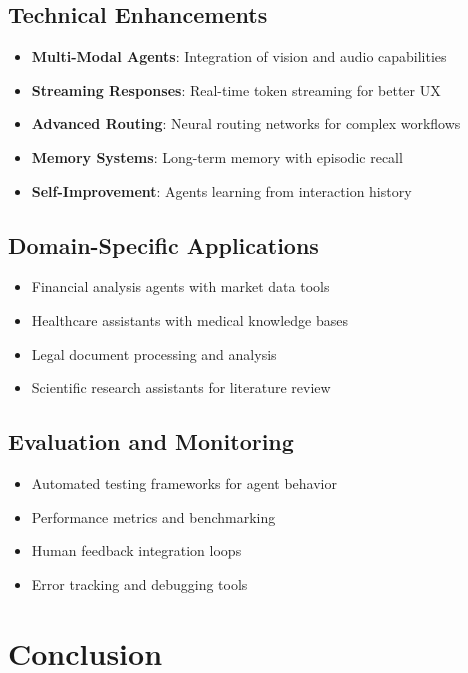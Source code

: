 \documentclass[12pt,a4paper]{article}
\begin{document}
\subsection{Technical Enhancements}

\begin{itemize}
    \item \textbf{Multi-Modal Agents}: Integration of vision and audio capabilities
    \item \textbf{Streaming Responses}: Real-time token streaming for better UX
    \item \textbf{Advanced Routing}: Neural routing networks for complex workflows
    \item \textbf{Memory Systems}: Long-term memory with episodic recall
    \item \textbf{Self-Improvement}: Agents learning from interaction history
\end{itemize}

\subsection{Domain-Specific Applications}

\begin{itemize}
    \item Financial analysis agents with market data tools
    \item Healthcare assistants with medical knowledge bases
    \item Legal document processing and analysis
    \item Scientific research assistants for literature review
\end{itemize}

\subsection{Evaluation and Monitoring}

\begin{itemize}
    \item Automated testing frameworks for agent behavior
    \item Performance metrics and benchmarking
    \item Human feedback integration loops
    \item Error tracking and debugging tools
\end{itemize}

\section{Conclusion}
\end{document}
